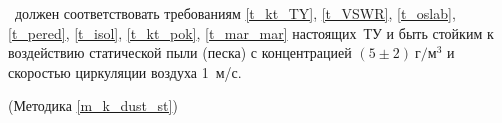\dut \  должен соответствовать требованиям  \ref{t_kt_TY}, \ref{t_VSWR}, \ref{t_oslab}, \ref{t_pered}, \ref{t_isol}, \ref{t_kt_pok}, \ref{t_mar_mar} настоящих~ТУ и быть стойким к воздействию статической пыли (песка) с концентрацией $(5\pm2)~г/м^3$ и скоростью циркуляции воздуха 1~м/с.

\begin{flushright}
(Методика \ref{m_k_dust_st})
\end{flushright}

